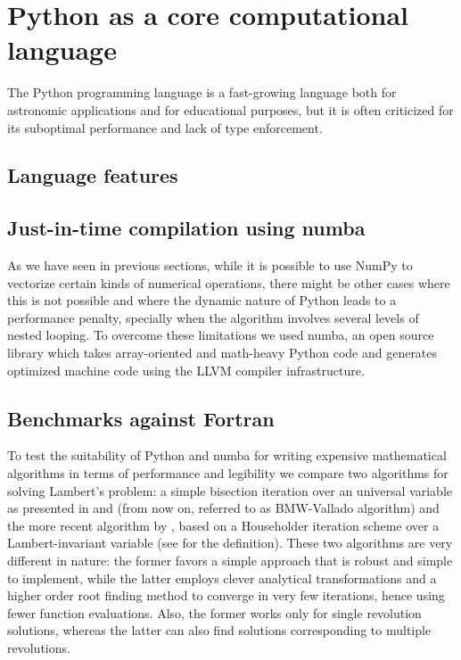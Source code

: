 \section{Python as a core computational language}
\label{sec:python}

The Python programming language is a fast-growing language both for astronomic applications\cite{2015arXiv150703989M} and for educational purposes\cite{guo2014python}, but it is often criticized for its suboptimal performance and lack of type enforcement.

\subsection{Language features}


\subsection{Just-in-time compilation using numba}

As we have seen in previous sections, while it is possible to use NumPy to vectorize certain kinds of numerical operations, there might be other cases where this is not possible and where the dynamic nature of Python leads to a performance penalty, specially when the algorithm involves several levels of nested looping. To overcome these limitations we used numba, an open source library which takes array-oriented and math-heavy Python code and generates optimized machine code using the LLVM compiler infrastructure\cite{numba}.

\subsection{Benchmarks against Fortran}

To test the suitability of Python and numba for writing expensive mathematical algorithms in terms of performance and legibility we compare two algorithms for solving Lambert's problem: a simple bisection iteration over an universal variable as presented in \cite{bate1971fundamentals} and \cite{vallado2001fundamentals} (from now on, referred to as BMW-Vallado algorithm) and the more recent algorithm by \cite{Izzo2014}, based on a Householder iteration scheme over a Lambert-invariant variable (see \cite{gooding1990procedure} for the definition). These two algorithms are very different in nature: the former favors a simple approach that is robust and simple to implement, while the latter employs clever analytical transformations and a higher order root finding method to converge in very few iterations, hence using fewer function evaluations. Also, the former works only for single revolution solutions, whereas the latter can also find solutions corresponding to multiple revolutions.

